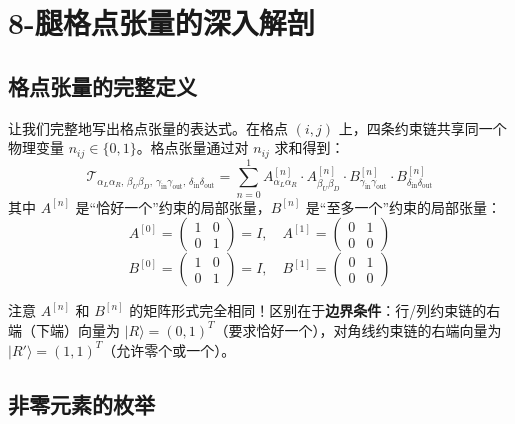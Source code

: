 \documentclass[12pt,a4paper]{ctexart}
\begin{document}
\section{8-腿格点张量的深入解剖}

\subsection{格点张量的完整定义}

让我们完整地写出格点张量的表达式。在格点 $(i,j)$ 上，四条约束链共享同一个物理变量 $n_{ij} \in \{0, 1\}$。格点张量通过对 $n_{ij}$ 求和得到：
\begin{equation}
\mathcal{T}_{\alpha_L \alpha_R,\, \beta_U \beta_D,\, \gamma_{\text{in}} \gamma_{\text{out}},\, \delta_{\text{in}} \delta_{\text{out}}} = \sum_{n=0}^{1} A^{[n]}_{\alpha_L \alpha_R} \cdot A^{[n]}_{\beta_U \beta_D} \cdot B^{[n]}_{\gamma_{\text{in}} \gamma_{\text{out}}} \cdot B^{[n]}_{\delta_{\text{in}} \delta_{\text{out}}}
\end{equation}
其中 $A^{[n]}$ 是``恰好一个''约束的局部张量，$B^{[n]}$ 是``至多一个''约束的局部张量：
\begin{equation}
A^{[0]} = \begin{pmatrix} 1 & 0 \\ 0 & 1 \end{pmatrix} = I, \quad
A^{[1]} = \begin{pmatrix} 0 & 1 \\ 0 & 0 \end{pmatrix}
\end{equation}
\begin{equation}
B^{[0]} = \begin{pmatrix} 1 & 0 \\ 0 & 1 \end{pmatrix} = I, \quad
B^{[1]} = \begin{pmatrix} 0 & 1 \\ 0 & 0 \end{pmatrix}
\end{equation}

注意 $A^{[n]}$ 和 $B^{[n]}$ 的矩阵形式完全相同！区别在于\textbf{边界条件}：行/列约束链的右端（下端）向量为 $|R\rangle = (0,1)^T$（要求恰好一个），对角线约束链的右端向量为 $|R'\rangle = (1,1)^T$（允许零个或一个）。

\subsection{非零元素的枚举}
\end{document}
